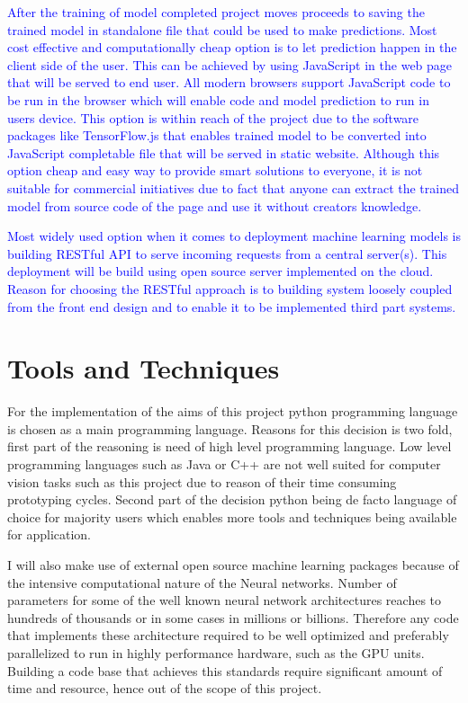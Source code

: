 \documentclass[12pt, twoside, a4paper]{article}
\begin{document}
\textcolor{blue}{After the training of model completed project moves proceeds to saving the trained model in standalone file that could be used to make predictions. Most cost effective and computationally cheap option is to let prediction happen in the client side of the user. This can be achieved by using JavaScript in the web page that will be served to end user. All modern browsers support JavaScript code to be run in the browser which will enable code and model prediction to run in users device. This option is within reach of the project due to the software packages like TensorFlow.js \cite{tensorjs} that enables trained model to be converted into JavaScript completable file that will be served in static website. Although this option cheap and easy way to provide smart solutions to everyone, it is not suitable for commercial initiatives due to fact that anyone can extract the trained model from source code of the page and use it without creators knowledge.}

\textcolor{blue}{Most widely used option when it comes to deployment machine learning models is building RESTful API to serve incoming requests from a central server(s).  This deployment will be build using open source server implemented on the cloud. Reason for choosing the RESTful approach is to building system loosely coupled from the front end design and to enable it to be implemented third part systems.}

\section{Tools and Techniques}
For the implementation of the aims of this project python programming language is chosen as a main programming language. Reasons for this decision is two fold, first part of the reasoning is need of high level programming language. Low level programming languages such as Java or C++ are not well suited for computer vision tasks such as this project due to reason of their time consuming prototyping cycles. Second part of the decision python being de facto language of choice for majority users which enables more tools and techniques being available for application. 

I will also make use of external open source machine learning packages because of the intensive computational nature of the Neural networks. Number of parameters for some of the well known neural network architectures reaches to hundreds of thousands or in some cases in millions or billions. Therefore any code that implements these architecture required to be well optimized and preferably parallelized to run in highly performance hardware, such as the GPU units. Building a code base that achieves this standards require significant amount of time and resource, hence out of the scope of this project. 
\end{document}
